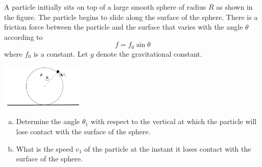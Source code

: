 \documentclass{esg8012exam}
\begin{document}
\begin{problem}{35}
  A particle initially sits on top of a large smooth sphere of radius $R$ as shown in the figure. The particle begins to slide along the surface of the sphere. There is a friction force between the particle and the surface that varies with the angle $\theta$ according to
  $$f = f_0\sin\theta$$
  where $f_0$ is a constant. Let $g$ denote the gravitational constant.
  \begin{center}\includegraphics[width=0.3\textwidth]{exam2_p2_1}\end{center}
  \begin{enumerate}[(a)]
    \item Determine the angle $\theta_1$ with respect to the vertical at which the particle will lose contact with the surface of the sphere.
    \item What is the speed $v_1$ of the particle at the instant it loses contact with the surface of the sphere.
  \end{enumerate}
\end{problem}
\end{document}

